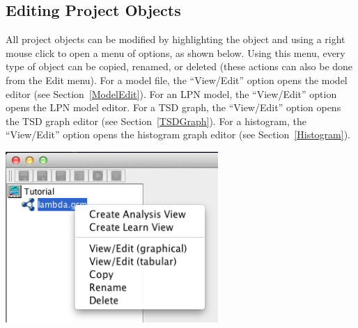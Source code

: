 \documentclass[titlepage,11pt]{article}
\begin{document}
\subsection{Editing Project Objects}

\noindent
All project objects can be modified by highlighting the object and using a right mouse click to open a menu of options, as shown below. Using this menu, every type of object can be copied, renamed, or deleted (these actions can also be done from the Edit menu).  For a model file, the ``View/Edit'' option opens the model editor (see Section~\ref{ModelEdit}).  For an LPN model, the ``View/Edit'' option opens the LPN model editor. 
For a TSD graph, the ``View/Edit'' option opens the TSD graph editor (see Section~\ref{TSDGraph}).  For a histogram, the ``View/Edit'' option opens the histogram graph editor 
(see Section~\ref{Histogram}).  

\begin{center}
\includegraphics[height=65mm]{screenshots/modGCM} 
\end{center}

\end{document}
